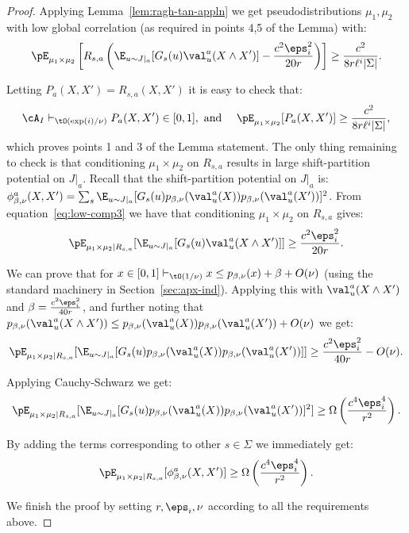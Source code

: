 \begin{proof}
Applying Lemma~\ref{lem:ragh-tan-appln} we get pseudodistributions $\mu_1,\mu_2$ with low global correlation (as required in points 4,5 of the Lemma) with:
\begin{equation}\label{eq:low-comp3}
\pE_{\mu_1 \times \mu_2}\left[R_{s,a} \left(\E_{u \sim J|_a}[G_s(u)\val^a_u(X \wedge X')] - \frac{c^2\eps_i^2}{20r}\right)\right] \geq \frac{c^2}{8r\ell^i|\Sigma|}.
\end{equation}

Letting $P_a(X,X') = R_{s,a}(X,X')$ it is easy to check that:
\[\cA_I \vdash_{\tO(\exp(i)/\nu)} P_a(X,X') \in [0,1], \text{ and }~~~ \pE_{\mu_1 \times \mu_2}[P_a(X,X')] \geq \frac{c^2}{8r\ell^i|\Sigma|},\]
which proves points 1 and 3 of the Lemma statement. The only thing remaining to check is that conditioning $\mu_1 \times \mu_2$ on $R_{s,a}$ results in large shift-partition potential on $J|_a$. Recall that the shift-partition potential on $J|_a$ is: $\phi^a_{\beta,\nu}(X,X') = \sum_s \E_{u \sim J|_a}[G_s(u)p_{\beta,\nu}(\val^a_u(X))p_{\beta,\nu}(\val^a_u(X'))]^2$. From equation~\eqref{eq:low-comp3} we have that conditioning $\mu_1 \times \mu_2$ on $R_{s,a}$ gives:
\[\pE_{\mu_1 \times \mu_2 | R_{s,a}}[\E_{u \sim J|_a}[G_s(u)\val^a_u(X \wedge X')]] \geq  \frac{c^2\eps_i^2}{20r}.\]

We can prove that for $x \in [0,1] \vdash_{\tO(1/\nu)} x \leq  p_{\beta,\nu}(x) + \beta + O(\nu)$ (using the standard machinery in Section~\ref{sec:apx-ind}). Applying this with $\val^a_u(X \wedge X')$ and $\beta = \frac{c^2\eps_i^2}{40r}$, and further noting that
$p_{\beta,\nu}(\val_u^a(X \wedge X')) \leq p_{\beta,\nu}(\val_u^a(X))p_{\beta,\nu}(\val_u^a(X')) + O(\nu)$ we get:
\[\pE_{\mu_1 \times \mu_2 | R_{s,a}}[\E_{u \sim J|_a}[G_s(u)p_{\beta,\nu}(\val_u^a(X))p_{\beta,\nu}(\val_u^a(X'))]] \geq  \frac{c^2\eps_i^2}{40r} - O(\nu).\]

Applying Cauchy-Schwarz we get:
\[\pE_{\mu_1 \times \mu_2 | R_{s,a}}[\E_{u \sim J|_a}[G_s(u)p_{\beta,\nu}(\val_u^a(X))p_{\beta,\nu}(\val_u^a(X'))]^2] \geq  \Omega\left(\frac{c^4\eps_i^4}{r^2}\right).\]

By adding the terms corresponding to other $s \in \Sigma$ we immediately get:
\begin{equation}\label{eq:potential-c0}
\pE_{\mu_1 \times \mu_2 | R_{s,a}}[\phi_{\beta,\nu}^a(X,X')] \geq \Omega\left(\frac{c^4\eps_i^4}{r^2}\right).
\end{equation}

We finish the proof by setting $r,\eps_i,\nu$ according to all the requirements above.


\end{proof}
